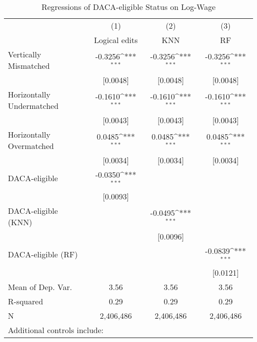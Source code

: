 \begin{table}[htbp]\centering
\def\sym#1{\ifmmode^{#1}\else\(^{#1}\)\fi}
\caption{Regressions of DACA-eligible Status on Log-Wage}
\begin{tabular}{l*{3}{c}}
\toprule
                    &\multicolumn{1}{c}{(1)}         &\multicolumn{1}{c}{(2)}         &\multicolumn{1}{c}{(3)}         \\
                    &Logical edits         &         KNN         &          RF         \\
\midrule
Vertically Mismatched&     -0.3256\sym{***}&     -0.3256\sym{***}&     -0.3256\sym{***}\\
                    &    [0.0048]         &    [0.0048]         &    [0.0048]         \\
\addlinespace
Horizontally Undermatched&     -0.1610\sym{***}&     -0.1610\sym{***}&     -0.1610\sym{***}\\
                    &    [0.0043]         &    [0.0043]         &    [0.0043]         \\
\addlinespace
Horizontally Overmatched&      0.0485\sym{***}&      0.0485\sym{***}&      0.0485\sym{***}\\
                    &    [0.0034]         &    [0.0034]         &    [0.0034]         \\
\addlinespace
DACA-eligible       &     -0.0350\sym{***}&                     &                     \\
                    &    [0.0093]         &                     &                     \\
\addlinespace
DACA-eligible (KNN) &                     &     -0.0495\sym{***}&                     \\
                    &                     &    [0.0096]         &                     \\
\addlinespace
DACA-eligible (RF)  &                     &                     &     -0.0839\sym{***}\\
                    &                     &                     &    [0.0121]         \\
\midrule
Mean of Dep. Var.   &        3.56         &        3.56         &        3.56         \\
R-squared           &        0.29         &        0.29         &        0.29         \\
N                   &   2,406,486         &   2,406,486         &   2,406,486         \\
\bottomrule
\multicolumn{4}{l}{\footnotesize Additional controls include:}\\

\end{tabular}
\end{table}

